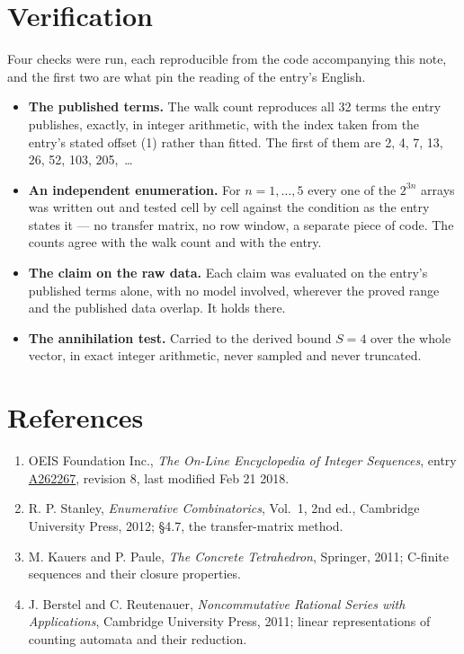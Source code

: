 \documentclass[11pt]{article}
\theoremstyle{definition}
\begin{document}
\section{Verification}

Four checks were run, each reproducible from the code accompanying this note, and the first two are what pin the reading of the entry's English.

\begin{itemize}

\item {\bfseries The published terms.} The walk count reproduces all 32 terms the entry publishes, exactly, in integer arithmetic, with the index taken from the entry's stated offset (1) rather than fitted. The first of them are 2, 4, 7, 13, 26, 52, 103, 205,~\dots

\item {\bfseries An independent enumeration.} For $n = 1,\dots,5$ every one of the $2^{3n}$ arrays was written out and tested cell by cell against the condition as the entry states it --- no transfer matrix, no row window, a separate piece of code. The counts agree with the walk count and with the entry.

\item {\bfseries The claim on the raw data.} Each claim was evaluated on the entry's published terms alone, with no model involved, wherever the proved range and the published data overlap. It holds there.

\item {\bfseries The annihilation test.} Carried to the derived bound $S = 4$ over the whole vector, in exact integer arithmetic, never sampled and never truncated.

\end{itemize}

\section{References}

\begin{enumerate}

\item OEIS Foundation Inc., \emph{The On-Line Encyclopedia of Integer Sequences}, entry \href{https://oeis.org/A262267}{A262267}, revision 8, last modified Feb 21 2018.

\item R. P. Stanley, \emph{Enumerative Combinatorics}, Vol.~1, 2nd ed., Cambridge University Press, 2012; \S4.7, the transfer-matrix method.

\item M. Kauers and P. Paule, \emph{The Concrete Tetrahedron}, Springer, 2011; C-finite sequences and their closure properties.

\item J. Berstel and C. Reutenauer, \emph{Noncommutative Rational Series with Applications}, Cambridge University Press, 2011; linear representations of counting automata and their reduction.

\end{enumerate}
\end{document}
